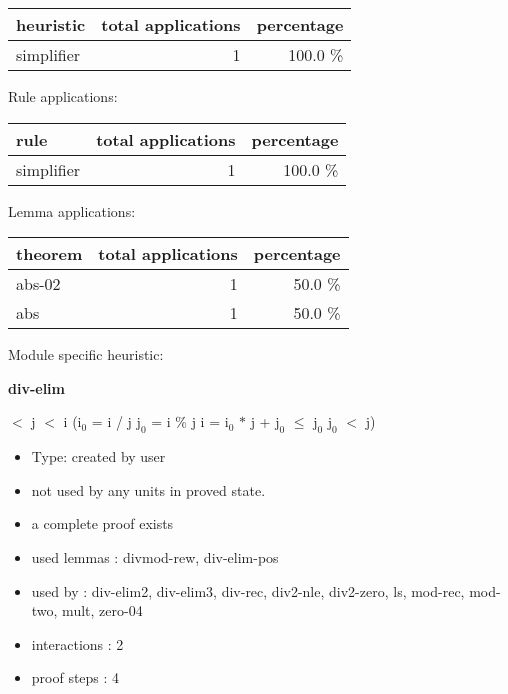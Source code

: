 \documentclass[a4paper]{article}
\begin{document}
\begin{supertabular}{l|r|r}
heuristic	& total applications & percentage \\ \hline
simplifier & 1 & 100.0 \% \\

\end{supertabular}

Rule applications:

\begin{supertabular}{l|r|r}
rule	        & total applications & percentage \\ \hline
simplifier & 1 & 100.0 \% \\

\end{supertabular}

Lemma applications:

\begin{supertabular}{l|r|r}
theorem	        & total applications & percentage \\ \hline
abs-02 & 1 & 50.0 \% \\
abs & 1 & 50.0 \% \\

\end{supertabular}

Module specific heuristic:

\pagebreak

{\LARGE\bf div-elim}\label{lemma-div-elim}

\medskip

  $<$ j  $<$ i \Imp ($\mbox{i}_{0}$ = i / j \And $\mbox{j}_{0}$ = i \% j \Equiv i = $\mbox{i}_{0}$ $*$ j + $\mbox{j}_{0}$  $\le$ $\mbox{j}_{0}$ \And $\mbox{j}_{0}$ $<$ j)

\begin{itemize}

\item Type: created by user

\item not used by any units in proved state.
\item       a complete proof exists
\item       used lemmas  : divmod-rew, div-elim-pos
\item       used by      : div-elim2, div-elim3, div-rec, div2-nle, div2-zero, ls, mod-rec, mod-two, mult, zero-04
\item       interactions : 2
\item       proof steps  : 4
\end{itemize}
\end{document}
